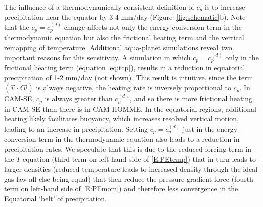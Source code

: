 The influence of a thermodynamically consistent definition of $c_p$ is to increase precipitation near the equator by 3-4 mm/day (Figure~\ref{fig:schematic}b). Note that the $c_p=c_p^{(d)}$ change affects not only the energy conversion term in the thermodynamic equation but also the frictional heating term and the vertical remapping of temperature. Additional aqua-planet simulations reveal two important reasons for this sensitivity. A simulation in which $c_p = c_p^{(d)}$ only in the frictional heating term (equation \eqref{eq:tcp}), results in a reduction in equatorial precipitation of 1-2 mm/day (not shown). This result is intuitive, since the term $\left(\vec{v}\cdot \delta \vec{v}\right)$ is always negative, the heating rate is inversely proportional to $c_p$. In CAM-SE, $c_p$ is always greater than $c_p^{(d)}$, and so there is more frictional heating in CAM-SE than there is in CAM-HOMME. In the equatorial regions, additional heating likely facilitates buoyancy, which increases resolved vertical motion, leading to an increase in precipitation. Setting $c_p = c_p^{(d)}$ just in the energy-conversion term in the thermodynamic equation also leads to a reduction in precipitation rates. We speculate that this is due to the reduced forcing term in the $T$-equation (third term on left-hand side of \eqref{E:PEtemp}) that in turn leads to larger densities (reduced temperature leads to increased density through the ideal gas law all else being equal) that then reduce the pressure gradient force (fourth term on left-hand side of \eqref{E:PEmom}) and therefore less convergence in the Equatorial `belt' of precipitation.

